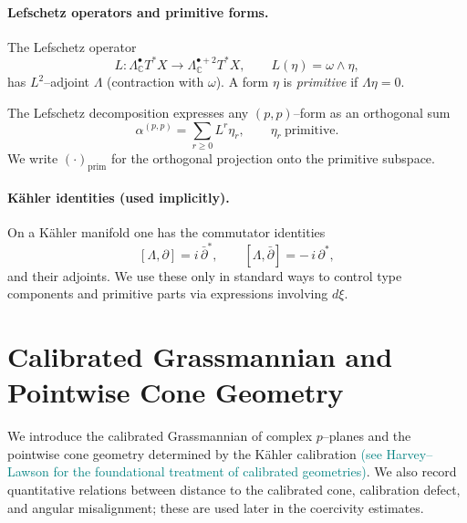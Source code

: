 \documentclass[11pt]{article}
\newcommand{\REVMZ}[1]{\textcolor{teal}{#1}}  %
\numberwithin{equation}{section}  %
\theoremstyle{plain}
\theoremstyle{definition}
\theoremstyle{remark}
\newcommand{\C}{\mathbb{C}}
\newcommand{\prim}{\mathrm{prim}}
\begin{document}
\paragraph{Lefschetz operators and primitive forms.}
The Lefschetz operator
\[
L:\Lambda_{\C}^{\bullet}T^{*}X\to\Lambda_{\C}^{\bullet+2}T^{*}X,
\qquad
L(\eta)=\omega\wedge\eta,
\]
has $L^{2}$--adjoint $\Lambda$ (contraction with $\omega$).
A form $\eta$ is \emph{primitive} if $\Lambda\eta=0$.

The Lefschetz decomposition \REVMZ{\cite[p.~122]{GH78}} expresses any $(p,p)$--form as an orthogonal sum
\[
\alpha^{(p,p)}=\sum_{r\ge0}L^{r}\eta_{r},
\qquad
\eta_{r}\ \text{primitive}.
\]
We write $(\cdot)_{\prim}$ for the orthogonal projection onto the primitive
subspace.

\paragraph{K\"ahler identities (used implicitly).}
On a K\"ahler manifold one has the commutator identities \REVMZ{\cite[p.~111]{GH78}}
\[
[\Lambda,\partial]=i\,\bar\partial^{*},
\qquad
[\Lambda,\bar\partial]=-\,i\,\partial^{*},
\]
and their adjoints.
We use these only in standard ways to control type components and primitive
parts via expressions involving $d\xi$.


\section{Calibrated Grassmannian and Pointwise Cone Geometry}
\label{sec:calibrated-grassmannian}

We introduce the calibrated Grassmannian of complex $p$--planes and the pointwise cone geometry determined by the K\"ahler calibration \REVMZ{(see Harvey--Lawson \cite{HL82} for the foundational treatment of calibrated geometries)}.
We also record quantitative relations between distance to the calibrated cone, calibration defect, and angular misalignment; these are used later in the coercivity estimates.
\end{document}
